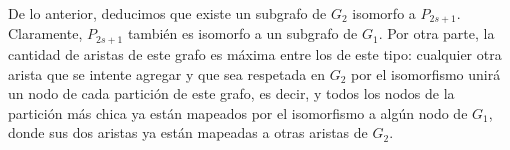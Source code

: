 De lo anterior, deducimos que existe un subgrafo de $G_2$ isomorfo a
$P_{2s+1}$. Claramente, $P_{2s+1}$ también es isomorfo a un subgrafo de $G_1$.
Por otra parte, la cantidad de aristas de este grafo es máxima entre los de
este tipo: cualquier otra arista que se intente agregar y que sea respetada en
$G_2$ por el isomorfismo unirá un nodo de cada partición de este grafo, es
decir, y todos los nodos de la partición más chica ya están mapeados por el
isomorfismo a algún nodo de $G_1$, donde sus dos aristas ya están mapeadas a
otras aristas de $G_2$.
